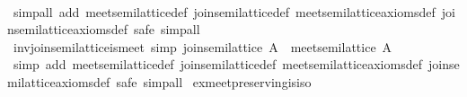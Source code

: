 \begin{isabellebody}
%
\isadelimproof
\ \ %
\endisadelimproof
%
\isatagproof
{}\isamarkupfalse%
\ {}simp{}all\ add{}\ meet{}semilattice{}def\ join{}semilattice{}def\ meet{}semilattice{}axioms{}def\ join{}semilattice{}axioms{}def{}\ safe{}\ simp{}all{}%
\endisatagproof
{\isafoldproof}%
%
\isadelimproof
\isanewline
%
\endisadelimproof
\isanewline
{}\isamarkupfalse%
\ inv{}join{}semilattice{}is{}meet\ {}simp{}{}\ {}join{}semilattice\ {}A{}{}\ {}\ meet{}semilattice\ A{}\isanewline
%
\isadelimproof
\ \ %
\endisadelimproof
%
\isatagproof
{}\isamarkupfalse%
\ {}simp\ add{}\ meet{}semilattice{}def\ join{}semilattice{}def\ meet{}semilattice{}axioms{}def\ join{}semilattice{}axioms{}def{}\ safe{}\ simp{}all{}%
\endisatagproof
{\isafoldproof}%
%
\isadelimproof
\isanewline
%
\endisadelimproof
\isanewline
{}\isamarkupfalse%
\ ex{}meet{}preserving{}is{}iso{}\isanewline

\end{isabellebody}
